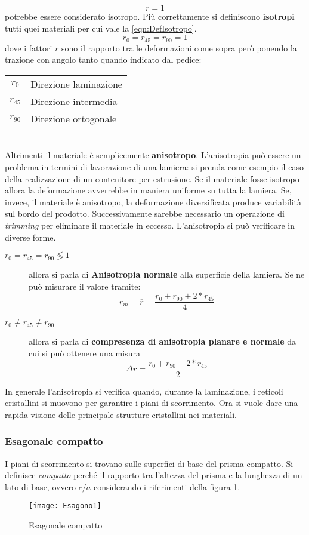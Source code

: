 \begin{equation}
r = 1
\end{equation}
potrebbe essere considerato isotropo. Più correttamente si definiscono \textbf{isotropi} tutti quei materiali per cui vale la \ref{eqn:DefIsotropo}.
\begin{equation}
r_0 = r_{45} = r_{90} = 1
\label{eqn:DefIsotropo}
\end{equation}
dove i fattori $r$ sono il rapporto tra le deformazioni come sopra però ponendo la trazione con angolo tanto quando indicato dal pedice:\\
\begin{tabular}{cl}
$r_0$ & Direzione laminazione\\
$r_{45}$ & Direzione intermedia\\
$r_{90}$ & Direzione ortogonale
\end{tabular}
\\
Altrimenti il materiale è semplicemente \textbf{anisotropo}.
L'anisotropia può essere un problema in termini di lavorazione di una lamiera: si prenda come esempio il caso della realizzazione di un contenitore per estrusione. Se il materiale fosse isotropo allora la deformazione avverrebbe in maniera uniforme su tutta la lamiera.
Se, invece, il materiale è anisotropo, la deformazione diversificata produce variabilità sul bordo del prodotto. Successivamente sarebbe necessario un operazione di \textit{trimming} per eliminare il materiale in eccesso.
L'anisotropia si può verificare in diverse forme.
\begin{description}
\item[$r_0 = r_{45} = r_{90} \lessgtr 1$] allora si parla di \textbf{Anisotropia normale} alla superficie della lamiera. Se ne può misurare il valore tramite:
\begin{equation}
r_m = \overline{r} = \frac{r_0 + r_{90} + 2 * r_{45}}{4}
\label{eqn:MisAnisotropia}
\end{equation}
\item[$r_0 \neq r_{45} \neq r_{90}$] allora si parla di \textbf{compresenza di anisotropia planare e normale} da cui si può ottenere una misura
\begin{equation}
\Delta r = \frac{r_0 + r_{90} - 2 * r_{45}}{2}
\label{eqn:MisPlanare}
\end{equation}
\end{description}
In generale l'anisotropia si verifica quando, durante la laminazione, i reticoli cristallini si muovono per garantire i piani di scorrimento.
Ora si vuole dare una rapida visione delle principale strutture cristallini nei materiali.

\subsubsection{Esagonale compatto}
I piani di scorrimento si trovano sulle superfici di base del prisma compatto.
Si definisce \textit{compatto} perché il rapporto tra l'altezza del prisma e la lunghezza di un lato di base, ovvero $c/a$ considerando i riferimenti della figura \ref{fig:EsaComp}.
\begin{figure}
\centering
\texttt{[image: Esagono1]}
\caption{Esagonale compatto}
\label{fig:EsaComp}
\end{figure}
